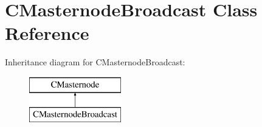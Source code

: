 \hypertarget{class_c_masternode_broadcast}{}\section{C\+Masternode\+Broadcast Class Reference}
\label{class_c_masternode_broadcast}
Inheritance diagram for C\+Masternode\+Broadcast\+:\begin{figure}[H]
\begin{center}
\leavevmode
\includegraphics[height=2.000000cm]{class_c_masternode_broadcast}
\end{center}
\end{figure}
